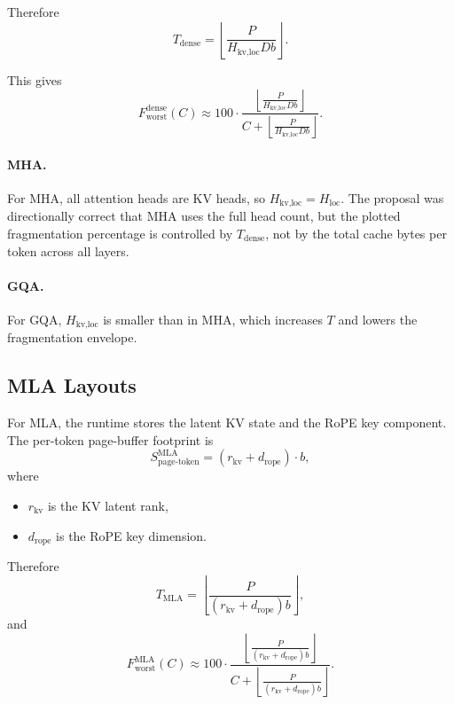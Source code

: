 \documentclass[11pt]{article}
\begin{document}
Therefore
\begin{equation}
T_{\text{dense}}
= \left\lfloor \frac{P}{H_{\text{kv,loc}} D b} \right\rfloor.
\end{equation}

This gives
\begin{equation}
F_{\text{worst}}^{\text{dense}}(C)
\approx
100 \cdot
\frac{
\left\lfloor \frac{P}{H_{\text{kv,loc}} D b} \right\rfloor
}{
C +
\left\lfloor \frac{P}{H_{\text{kv,loc}} D b} \right\rfloor
}.
\end{equation}

\paragraph{MHA.}
For MHA, all attention heads are KV heads, so $H_{\text{kv,loc}} = H_{\text{loc}}$.
The proposal was directionally correct that MHA uses the full head count, but the plotted fragmentation percentage is controlled by $T_{\text{dense}}$, not by the total cache bytes per token across all layers.

\paragraph{GQA.}
For GQA, $H_{\text{kv,loc}}$ is smaller than in MHA, which increases $T$ and lowers the fragmentation envelope.

\subsection{MLA Layouts}

For MLA, the runtime stores the latent KV state and the RoPE key component.
The per-token page-buffer footprint is
\begin{equation}
S_{\text{page-token}}^{\text{MLA}}
= (r_{\text{kv}} + d_{\text{rope}}) \cdot b,
\end{equation}
where
\begin{itemize}
    \item $r_{\text{kv}}$ is the KV latent rank,
    \item $d_{\text{rope}}$ is the RoPE key dimension.
\end{itemize}

Therefore
\begin{equation}
T_{\text{MLA}}
= \left\lfloor \frac{P}{(r_{\text{kv}} + d_{\text{rope}}) b} \right\rfloor,
\end{equation}
and
\begin{equation}
F_{\text{worst}}^{\text{MLA}}(C)
\approx
100 \cdot
\frac{
\left\lfloor \frac{P}{(r_{\text{kv}} + d_{\text{rope}}) b} \right\rfloor
}{
C +
\left\lfloor \frac{P}{(r_{\text{kv}} + d_{\text{rope}}) b} \right\rfloor
}.
\end{equation}
\end{document}
